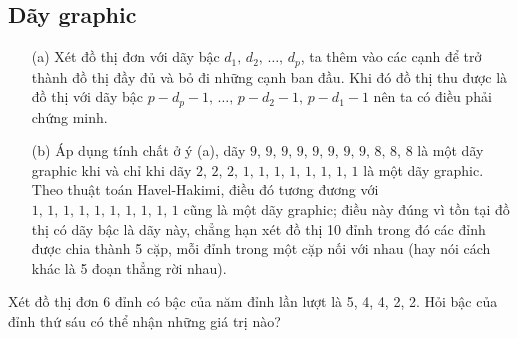 \subsection{Dãy graphic}

        


\begin{enumerate}
    \item[(a)] Xét đồ thị đơn với dãy bậc $d_1,\,d_2,\,\ldots,\,d_p$, ta thêm vào các cạnh để trở thành đồ thị đầy đủ và bỏ đi những cạnh ban đầu. Khi đó đồ thị thu được là đồ thị với dãy bậc $p - d_p - 1,\,\ldots,\,p-d_2-1,\,p-d_1-1$ nên ta có điều phải chứng minh.
    \item[(b)] Áp dụng tính chất ở ý (a), dãy $9,\,9,\,9,\,9,\,9,\,9,\,9,\,9,\,8,\,8,\,8$ là một dãy graphic khi và chỉ khi dãy $2,\,2,\,2,\,1,\,1,\,1,\,1,\,1,\,1,\,1,\,1$ là một dãy graphic. Theo thuật toán Havel-Hakimi, điều đó tương đương với $1,\,1,\,1,\,1,\,1,\,1,\,1,\,1,\,1,\,1$ cũng là một dãy graphic; điều này đúng vì tồn tại đồ thị có dãy bậc là dãy này, chẳng hạn xét đồ thị 10 đỉnh trong đó các đỉnh được chia thành 5 cặp, mỗi đỉnh trong một cặp nối với nhau (hay nói cách khác là 5 đoạn thẳng rời nhau).
\end{enumerate}

\begin{tcolorbox}[breakable]
    \begin{baitoan}\label{pb:w02:07}
        Xét đồ thị đơn 6 đỉnh có bậc của năm đỉnh lần lượt là 5, 4, 4, 2, 2. Hỏi bậc của đỉnh thứ sáu có thể nhận những giá trị nào?
    \end{baitoan}
\end{tcolorbox}

